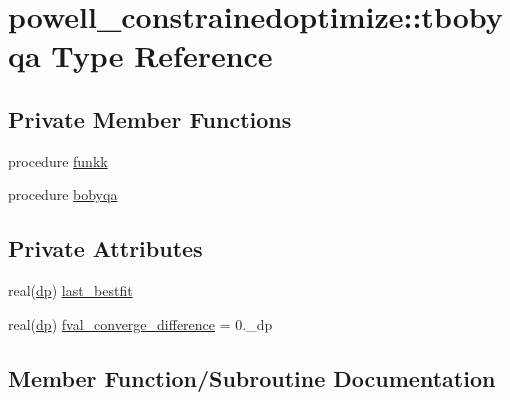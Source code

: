\hypertarget{structpowell__constrainedoptimize_1_1tbobyqa}{}\section{powell\+\_\+constrainedoptimize\+:\+:tbobyqa Type Reference}
\label{structpowell__constrainedoptimize_1_1tbobyqa}
\subsection*{Private Member Functions}
\begin{DoxyCompactItemize}
\item 
procedure \mbox{\hyperlink{structpowell__constrainedoptimize_1_1tbobyqa_a4a603f0c62e893e48f390eec75808ce9}{funkk}}
\item 
procedure \mbox{\hyperlink{structpowell__constrainedoptimize_1_1tbobyqa_a58d1806ffc95dc2da1a047b9c85866a0}{bobyqa}}
\end{DoxyCompactItemize}
\subsection*{Private Attributes}
\begin{DoxyCompactItemize}
\item 
real(\mbox{\hyperlink{namespacepowell__constrainedoptimize_a8a0275c8eca26a533d0e5d9aef7b9eaa}{dp}}) \mbox{\hyperlink{structpowell__constrainedoptimize_1_1tbobyqa_ace01b7bae8ebc72f66cd27816f7816a6}{last\+\_\+bestfit}}
\item 
real(\mbox{\hyperlink{namespacepowell__constrainedoptimize_a8a0275c8eca26a533d0e5d9aef7b9eaa}{dp}}) \mbox{\hyperlink{structpowell__constrainedoptimize_1_1tbobyqa_a6ccf7c4448e495676ccaad2f03e01355}{fval\+\_\+converge\+\_\+difference}} = 0.\+\_\+dp
\end{DoxyCompactItemize}


\subsection{Member Function/\+Subroutine Documentation}
\mbox{\label{structpowell__constrainedoptimize_1_1tbobyqa_a58d1806ffc95dc2da1a047b9c85866a0}} 
